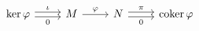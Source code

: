 \documentclass{article}
\begin{document}
    \begin{equation*}
        \begin{tikzcd}
            \ker\phi \ar[r, "\iota", shift left=0.5ex] \ar[r, "0"', shift right=0.5ex] & M \ar[r, "\phi"] & N \ar[r, "\pi", shift left=0.5ex] \ar[r, "0"', shift right=0.5ex] & \coker\phi
        \end{tikzcd}
    \end{equation*}
\end{document}
